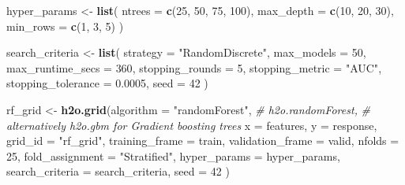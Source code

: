 \documentclass[]{article}
\newenvironment{Shaded}{\begin{snugshade}}{\end{snugshade}}
\newcommand{\KeywordTok}[1]{\textcolor[rgb]{0.13,0.29,0.53}{\textbf{{#1}}}}
\newcommand{\DataTypeTok}[1]{\textcolor[rgb]{0.13,0.29,0.53}{{#1}}}
\newcommand{\DecValTok}[1]{\textcolor[rgb]{0.00,0.00,0.81}{{#1}}}
\newcommand{\FloatTok}[1]{\textcolor[rgb]{0.00,0.00,0.81}{{#1}}}
\newcommand{\StringTok}[1]{\textcolor[rgb]{0.31,0.60,0.02}{{#1}}}
\newcommand{\CommentTok}[1]{\textcolor[rgb]{0.56,0.35,0.01}{\textit{{#1}}}}
\newcommand{\NormalTok}[1]{{#1}}
\begin{document}
\begin{Shaded}
\begin{Highlighting}[]
\NormalTok{hyper_params <-}\StringTok{ }\KeywordTok{list}\NormalTok{(}
                     \DataTypeTok{ntrees =} \KeywordTok{c}\NormalTok{(}\DecValTok{25}\NormalTok{, }\DecValTok{50}\NormalTok{, }\DecValTok{75}\NormalTok{, }\DecValTok{100}\NormalTok{),}
                     \DataTypeTok{max_depth =} \KeywordTok{c}\NormalTok{(}\DecValTok{10}\NormalTok{, }\DecValTok{20}\NormalTok{, }\DecValTok{30}\NormalTok{),}
                     \DataTypeTok{min_rows =} \KeywordTok{c}\NormalTok{(}\DecValTok{1}\NormalTok{, }\DecValTok{3}\NormalTok{, }\DecValTok{5}\NormalTok{)}
                     \NormalTok{)}

\NormalTok{search_criteria <-}\StringTok{ }\KeywordTok{list}\NormalTok{(}
                        \DataTypeTok{strategy =} \StringTok{"RandomDiscrete"}\NormalTok{, }
                        \DataTypeTok{max_models =} \DecValTok{50}\NormalTok{,}
                        \DataTypeTok{max_runtime_secs =} \DecValTok{360}\NormalTok{,}
                        \DataTypeTok{stopping_rounds =} \DecValTok{5}\NormalTok{,          }
                        \DataTypeTok{stopping_metric =} \StringTok{"AUC"}\NormalTok{,      }
                        \DataTypeTok{stopping_tolerance =} \FloatTok{0.0005}\NormalTok{,}
                        \DataTypeTok{seed =} \DecValTok{42}
                        \NormalTok{)}
\end{Highlighting}
\end{Shaded}

\begin{Shaded}
\begin{Highlighting}[]
\NormalTok{rf_grid <-}\StringTok{ }\KeywordTok{h2o.grid}\NormalTok{(}\DataTypeTok{algorithm =} \StringTok{"randomForest"}\NormalTok{, }\CommentTok{# h2o.randomForest, }
                                                \CommentTok{# alternatively h2o.gbm for Gradient boosting trees}
                    \DataTypeTok{x =} \NormalTok{features,}
                    \DataTypeTok{y =} \NormalTok{response,}
                    \DataTypeTok{grid_id =} \StringTok{"rf_grid"}\NormalTok{,}
                    \DataTypeTok{training_frame =} \NormalTok{train,}
                    \DataTypeTok{validation_frame =} \NormalTok{valid,}
                    \DataTypeTok{nfolds =} \DecValTok{25}\NormalTok{,                           }
                    \DataTypeTok{fold_assignment =} \StringTok{"Stratified"}\NormalTok{,}
                    \DataTypeTok{hyper_params =} \NormalTok{hyper_params,}
                    \DataTypeTok{search_criteria =} \NormalTok{search_criteria,}
                    \DataTypeTok{seed =} \DecValTok{42}
                    \NormalTok{)}
\end{Highlighting}
\end{Shaded}
\end{document}
